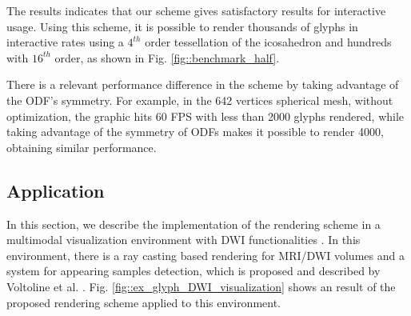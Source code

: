 \documentclass[twoside,twocolumn,10pt]{article}
\begin{document}
The results indicates that our scheme gives satisfactory results for interactive usage. Using this scheme, it is possible to render thousands of glyphs in interactive rates using a $4^{th}$ order tessellation of the icosahedron and hundreds with $16^{th}$ order, as shown in Fig. \ref{fig::benchmark_half}.

There is a relevant performance difference in the scheme by taking advantage of the ODF's symmetry. For example, in the 642 vertices spherical mesh, without optimization, the graphic hits 60 FPS with less than 2000 glyphs rendered, while taking advantage of the symmetry of ODFs makes it possible to render 4000, obtaining similar performance.









\subsection{Application}

In this section, we describe the implementation of the rendering scheme in a multimodal visualization environment with DWI functionalities \cite{VMTKNeuro}. In this environment, there is a ray casting based rendering for MRI/DWI volumes and a system for appearing samples detection, which is proposed and described by Voltoline et al. \cite{voltoline2021}. Fig. \ref{fig::ex_glyph_DWI_visualization} shows an result of the proposed rendering scheme applied to this environment.
\end{document}
